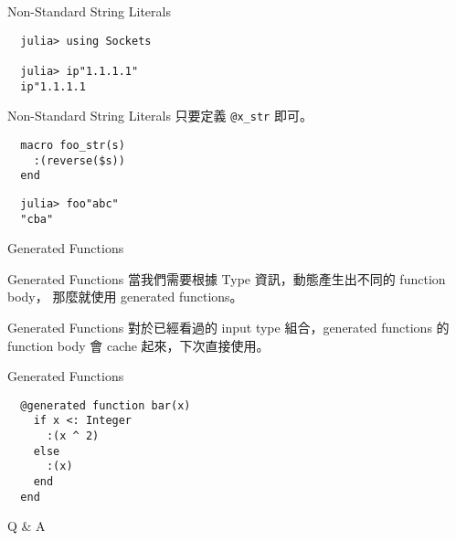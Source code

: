 \documentclass[14pt]{beamer}
\begin{document}
\begin{frame}[fragile]{Non-Standard String Literals}
\begin{lstlisting}
  julia> using Sockets

  julia> ip"1.1.1.1"
  ip"1.1.1.1
\end{lstlisting}
\end{frame}


\begin{frame}[fragile]{Non-Standard String Literals}
  只要定義 \texttt{@x\_str} 即可。

  \pause

\begin{lstlisting}
  macro foo_str(s)
    :(reverse($s))
  end
\end{lstlisting}

  \pause
\begin{lstlisting}
  julia> foo"abc"
  "cba"
\end{lstlisting}
\end{frame}


\begin{frame}[c]{}
  \centering
  \huge
  Generated Functions
\end{frame}


\begin{frame}[fragile]{Generated Functions}
  當我們需要根據 Type 資訊，動態產生出不同的 function body，
  那麼就使用 generated functions。
\end{frame}


\begin{frame}[fragile]{Generated Functions}
  對於已經看過的 input type 組合，generated functions 的
  function body 會 cache 起來，下次直接使用。
\end{frame}


\begin{frame}[fragile]{Generated Functions}

\begin{lstlisting}
  @generated function bar(x)
    if x <: Integer
      :(x ^ 2)
    else
      :(x)
    end
  end
\end{lstlisting}
\end{frame}


\begin{frame}[c]{}
  \centering
  \Huge
  Q \& A
\end{frame}
\end{document}
